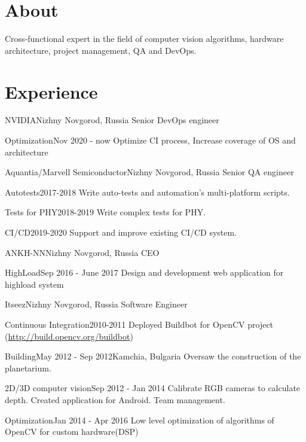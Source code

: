 \documentclass[12pt,a4paper]{moderncv}
\begin{document}
\maketitle

\section{About}
Cross-functional expert in the field of computer vision algorithms, hardware architecture, project management, QA and DevOps.

\section{Experience}
	{NVIDIA}{Nizhny Novgorod, Russia}{}{}
	{Senior DevOps engineer}

\cventry{}
	{Optimization}{Nov 2020 - now}{}{}
	{Optimize CI process, Increase coverage of OS and architecture}

	{Aquantia/Marvell Semiconductor}{Nizhny Novgorod, Russia}{}{}
	{Senior QA engineer}

\cventry{}
	{Autotests}{2017-2018}{}{}
	{Write auto-tests and automation's multi-platform scripts.}

\cventry{}
	{Tests for PHY}{2018-2019}{}{}
	{Write complex tests for PHY.}

\cventry{}
	{CI/CD}{2019-2020}{}{}
	{Support and improve existing CI/CD system.}

	{ANKH-NN}{Nizhny Novgorod, Russia}{}{}
	{CEO}

\cventry{}
	{HighLoad}{Sep 2016 - June 2017}{}{}
	{Design and development web application for highload system}

	{Itseez}{Nizhny Novgorod, Russia}{}{}
	{Software Engineer}

\cventry{}
	{Continuous Integration}{2010-2011}{}{}
	{Deployed Buildbot for OpenCV project (\url{http://build.opencv.org/buildbot})}

\cventry{}
	{Building}{May 2012 - Sep 2012}{Kamchia, Bulgaria}{}
	{Oversaw the construction of the planetarium.}

\cventry{}
	{2D/3D computer vision}{Sep 2012 - Jan 2014}{} {}
	{Calibrate RGB cameras to calculate depth. Created application for Android. Team management.}

\cventry{}
	{Optimization}{Jan 2014 - Apr 2016}{}{}
	{Low level optimization of algorithms of OpenCV for custom hardware(DSP)}
\end{document}
